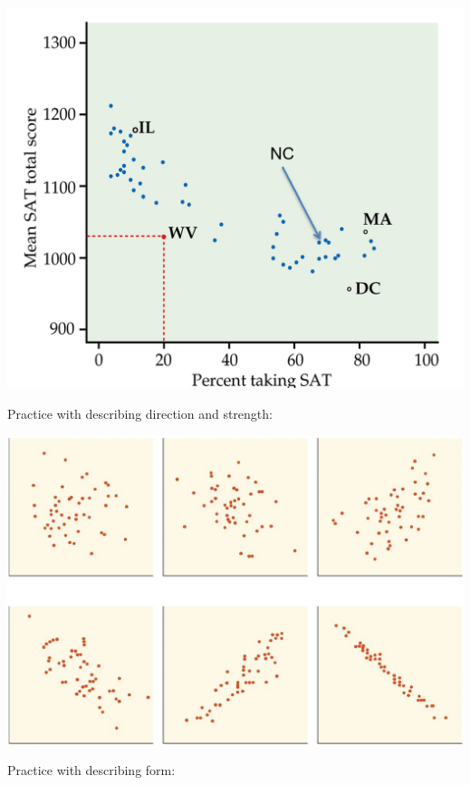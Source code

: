 \documentclass[11pt,letterpaper,twoside]{article}
\begin{document}
\vspace{80pt}

\begin{center}
\includegraphics[scale=0.85]{images/scatter3.png}
\end{center}

\newpage

Practice with describing direction and strength:

\begin{center}
\includegraphics[scale=0.5]{images/scatters.png}
\end{center}
\vspace{10pt}
Practice with describing form:
\end{document}
